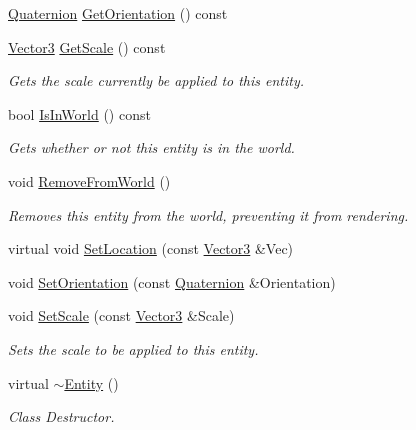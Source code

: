 \begin{DoxyCompactItemize}
\hyperlink{classMezzanine_1_1Quaternion}{Quaternion} \hyperlink{classMezzanine_1_1Entity_a3ffd4d4d16a5c3579201491af3363fc9}{GetOrientation} () const 
\item 
\hyperlink{classMezzanine_1_1Vector3}{Vector3} \hyperlink{classMezzanine_1_1Entity_a958821b62fcedeff19d50de7fb01bbe0}{GetScale} () const 
\begin{DoxyCompactList}\small\item\em Gets the scale currently be applied to this entity. \item\end{DoxyCompactList}\item 
bool \hyperlink{classMezzanine_1_1Entity_a150d2efaeff73bea1fe19735d81cfa30}{IsInWorld} () const 
\begin{DoxyCompactList}\small\item\em Gets whether or not this entity is in the world. \item\end{DoxyCompactList}\item 
void \hyperlink{classMezzanine_1_1Entity_aa06ec4c242877260d6ca16a512294bf7}{RemoveFromWorld} ()
\begin{DoxyCompactList}\small\item\em Removes this entity from the world, preventing it from rendering. \item\end{DoxyCompactList}\item 
virtual void \hyperlink{classMezzanine_1_1Entity_a7cb26c149bc32945dcf12f60b2216079}{SetLocation} (const \hyperlink{classMezzanine_1_1Vector3}{Vector3} \&Vec)
\item 
void \hyperlink{classMezzanine_1_1Entity_ad498093c5a2b8ef3bfb9311aff719d67}{SetOrientation} (const \hyperlink{classMezzanine_1_1Quaternion}{Quaternion} \&Orientation)
\item 
void \hyperlink{classMezzanine_1_1Entity_a19c513720fa5657c262378b7b0435556}{SetScale} (const \hyperlink{classMezzanine_1_1Vector3}{Vector3} \&Scale)
\begin{DoxyCompactList}\small\item\em Sets the scale to be applied to this entity. \item\end{DoxyCompactList}\item 
\hypertarget{classMezzanine_1_1Entity_a030c609ef574de6f3c1e474dfe119e48}{
virtual \hyperlink{classMezzanine_1_1Entity_a030c609ef574de6f3c1e474dfe119e48}{$\sim$Entity} ()}
\label{classMezzanine_1_1Entity_a030c609ef574de6f3c1e474dfe119e48}

\begin{DoxyCompactList}\small\item\em Class Destructor. \item\end{DoxyCompactList}\end{DoxyCompactItemize}

